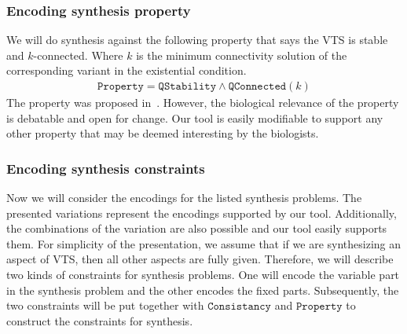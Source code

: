 \subsubsection{Encoding synthesis property}
%
We will do synthesis against the following property that says the VTS
is stable and $k$-connected.
%
Where $k$ is the minimum connectivity solution of the corresponding variant in the existential condition.
%
%
\begin{align*}
\texttt{Property} =  \texttt{QStability} \land \texttt{QConnected}(k) 
\end{align*}
The property was proposed in~\cite{shukla2017discovering}.
%
However, the biological relevance of the property is debatable and open for change.
%
Our tool is easily modifiable to support any other property that may be deemed 
interesting by the biologists.

\subsubsection{Encoding synthesis constraints}

Now we will consider the encodings for the
listed synthesis problems.
%
The presented variations represent the encodings
supported by our tool.
%
Additionally, the combinations of the variation are also possible and
our tool easily supports them.
%
For simplicity of the presentation, we assume that if we are
synthesizing an aspect of VTS, then all other aspects are fully given.
%
Therefore, we will describe two kinds of constraints for synthesis
problems.
%
One will encode the variable part in the synthesis problem and
the other encodes the fixed parts.
%
Subsequently, the two constraints will be put together with 
$\texttt{Consistancy}$ and 
$\texttt{Property}$ to construct the constraints for synthesis.


